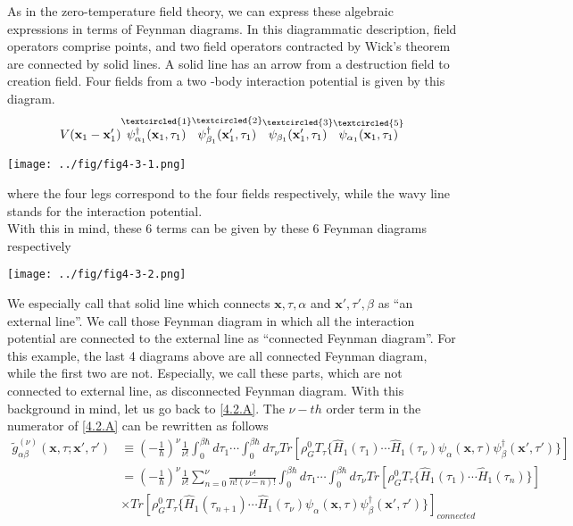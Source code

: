 As in the zero-temperature field theory, we can express these algebraic expressions in terms of Feynman diagrams.
In this diagrammatic description, field operators comprise points, and two field operators contracted by Wick's theorem are connected by solid lines.
A solid line has an arrow from a destruction field to creation field.
Four fields from a two -body interaction potential is given by this diagram.
$$
\begin{aligned}
V(\mathbf{x}_1-\mathbf{x}_1') \overset{\textcircled{1}}{\psi_{\alpha_1}^\dagger (\mathbf{x}_1,\tau_1)} \overset{\textcircled{2}}{\psi_{\beta_1}^\dagger (\mathbf{x}_1',\tau_1)} \overset{\textcircled{3}}{\psi_{\beta_1}(\mathbf{x}_1',\tau_1)} \overset{\textcircled{5}}{\psi_{\alpha_1}(\mathbf{x}_1,\tau_1)}
\end{aligned}
$$
\begin{center}
\texttt{[image: ../fig/fig4-3-1.png]}
\end{center}
where the four legs correspond to the four fields respectively, while the wavy line stands for the interaction potential.\\
With this in mind, these 6 terms can be given by these 6 Feynman diagrams respectively
\begin{center}
\texttt{[image: ../fig/fig4-3-2.png]}
\end{center}
We especially call that solid line which connects $\mathbf{x},\tau,\alpha$ and $\mathbf{x}',\tau',\beta$ as ``an external line''.
We call those Feynman diagram in which all the interaction potential are connected to the external line as ``connected Feynman diagram''.
For this example, the last 4 diagrams above are all connected Feynman diagram, while the first two are not.
Especially, we call these parts, which are not connected to external line, as disconnected Feynman diagram.
With this background in mind, let us go back to \ref{4.2.A}.
The $\nu-th$ order term in the numerator of \ref{4.2.A} can be rewritten as follows
$$
\begin{aligned}
\tilde{g}^{(\nu)}_{\alpha\beta}(\mathbf{x},\tau;\mathbf{x}',\tau')&\equiv \left(-\frac{1}{\hbar}\right)^\nu \frac{1}{\nu!} \int_0^{\beta\hbar}d\tau_1\cdots \int_0^{\beta\hbar}d\tau_\nu Tr\left[\rho_G^0 T_\tau\{\hat{H}_1(\tau_1) \cdots \hat{H}_1(\tau_\nu) \psi_\alpha(\mathbf{x},\tau) \psi_\beta^\dagger(\mathbf{x}',\tau')\}\right]\\
&=\left(-\frac{1}{\hbar}\right)^\nu \frac{1}{\nu!} \sum_{n=0}^\nu \frac{\nu!}{n!(\nu-n)!} \int_0^{\beta\hbar}d\tau_1\cdots \int_0^{\beta\hbar}d\tau_\nu Tr\left[\rho_G^0 T_\tau\{\hat{H}_1(\tau_1) \cdots \hat{H}_1(\tau_n)\}\right]\\
&\times Tr\left[\rho_G^0 T_\tau\{\hat{H}_1(\tau_{n+1}) \cdots \hat{H}_1(\tau_\nu) \psi_\alpha(\mathbf{x},\tau) \psi_\beta^\dagger(\mathbf{x}',\tau')\}\right]_{connected}
\end{aligned}
$$
